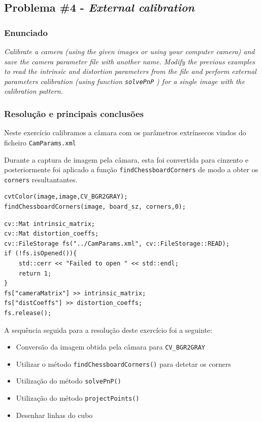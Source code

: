 \documentclass[portuguese, times, mirror]{revdetua}
\begin{document}


\subsection{Problema \#4 - \textit{External calibration}}

\subsubsection{Enunciado}
\textit{Calibrate a camera (using the given images or using your computer camera) and save the camera parameter file with another name.
Modify the previous examples to read the intrinsic and distortion parameters from the file and perform external parameters calibration (using function \texttt{solvePnP} ) for a single image with the calibration pattern.}

\subsubsection{Resolução e principais conclusões}

Neste exercício calibramos a câmara com os parâmetros extrínsecos vindos do ficheiro \texttt{CamParams.xml}

Durante a captura de imagem pela câmara, esta foi convertida para cinzento e posteriormente foi aplicado a função \texttt{findChessboardCorners} de modo a obter os \texttt{corners} resultantantes. 






\begin{lstlisting}[caption=Converter para cinza e calcular corners,label=code:C]
cvtColor(image,image,CV_BGR2GRAY);
findChessboardCorners(image, board_sz, corners,0);
\end{lstlisting}



\begin{lstlisting}[caption=Leitura do XML,label=code:C]
cv::Mat intrinsic_matrix;
cv::Mat distortion_coeffs;
cv::FileStorage fs("../CamParams.xml", cv::FileStorage::READ);
if (!fs.isOpened()){
    std::cerr << "Failed to open " << std::endl;
    return 1;
}
fs["cameraMatrix"] >> intrinsic_matrix;
fs["distCoeffs"] >> distortion_coeffs;
fs.release();
\end{lstlisting}

A sequência seguida para a resolução deste exercício foi a seguinte: 

\begin{itemize}
    \item Conversão da imagem obtida pela câmara para \texttt{CV\_BGR2GRAY}
    \item Utilizar o método \texttt{findChessboardCorners()} para detetar os corners
    \item Utilização do método \texttt{solvePnP()}
    \item Utilização do método \texttt{projectPoints()}
    \item Desenhar linhas do cubo 
\end{itemize}
\end{document}
